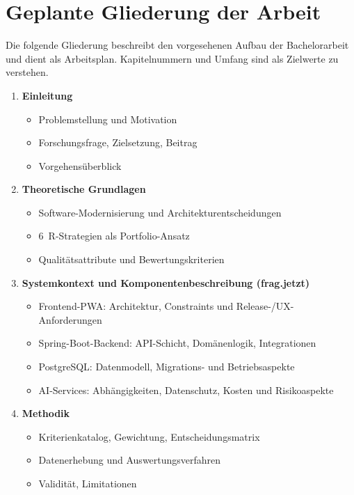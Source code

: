 \section{Geplante Gliederung der Arbeit}

Die folgende Gliederung beschreibt den vorgesehenen Aufbau der Bachelorarbeit und dient als Arbeitsplan. Kapitelnummern und Umfang sind als Zielwerte zu verstehen.

\begin{enumerate}
  \item \textbf{Einleitung}
  \begin{itemize}
    \item Problemstellung und Motivation
    \item Forschungsfrage, Zielsetzung, Beitrag
    \item Vorgehensüberblick
  \end{itemize}

  \item \textbf{Theoretische Grundlagen}
  \begin{itemize}
    \item Software-Modernisierung und Architekturentscheidungen~\cite{richards2020fundamentals,ford2021hardparts}
    \item 6~R-Strategien als Portfolio-Ansatz~\cite{aws2023sixRs}
    \item Qualitätsattribute und Bewertungskriterien
  \end{itemize}

  \item \textbf{Systemkontext und Komponentenbeschreibung (frag.jetzt)}
  \begin{itemize}
    \item Frontend-PWA: Architektur, Constraints und Release-/UX-Anforderungen~\cite{mdn2024pwa}
    \item Spring-Boot-Backend: API-Schicht, Domänenlogik, Integrationen~\cite{springboot2024docs}
    \item PostgreSQL: Datenmodell, Migrations- und Betriebsaspekte~\cite{postgresql2023docs}
    \item AI-Services: Abhängigkeiten, Datenschutz, Kosten und Risikoaspekte~\cite{nist2023airmf}
  \end{itemize}

  \item \textbf{Methodik}
  \begin{itemize}
    \item Kriterienkatalog, Gewichtung, Entscheidungsmatrix
    \item Datenerhebung und Auswertungsverfahren
    \item Validität, Limitationen
  \end{itemize}


\end{enumerate}
